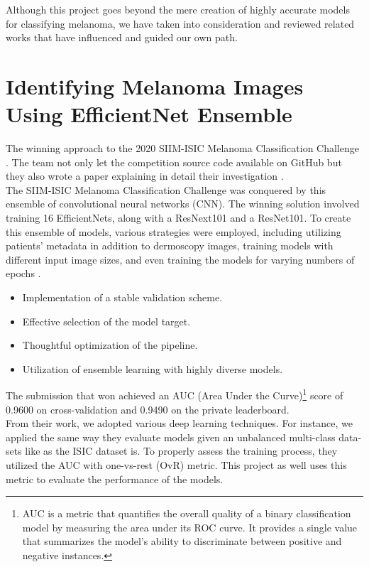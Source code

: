 Although this project goes beyond the mere creation of highly accurate models
for classifying melanoma, we have taken into consideration and reviewed related
works that have influenced and guided our own path.

\section{Identifying Melanoma Images Using EfficientNet Ensemble}

The winning approach to the 2020 SIIM-ISIC Melanoma Classification Challenge
\cite{ISICKaggle}. The team not only let the competition source code available
on GitHub \cite{WinningISICGithub} but they also wrote a paper explaining in
detail their investigation \cite{WinningISIC}. \\

The SIIM-ISIC Melanoma Classification Challenge was conquered by this ensemble of
convolutional neural networks (CNN). The winning solution involved training 16
EfficientNets, along with a ResNext101 and a ResNet101. To create this ensemble
of models, various strategies were employed, including utilizing patients'
metadata in addition to dermoscopy images, training models with different input
image sizes, and even training the models for varying numbers of epochs
\cite{WinningISIC}.

\begin{itemize}
  \item Implementation of a stable validation scheme.
  \item Effective selection of the model target.
  \item Thoughtful optimization of the pipeline.
  \item Utilization of ensemble learning with highly diverse models.
\end{itemize}

The submission that won achieved an AUC (Area Under the Curve)\footnote{AUC is
a metric that quantifies the overall quality of a binary classification model
by measuring the area under its ROC curve. It provides a single value that
summarizes the model's ability to discriminate between positive and negative
instances.} score of 0.9600 on cross-validation and 0.9490 on the private
leaderboard. \\

From their work, we adopted various deep learning techniques. For instance, we
applied the same way they evaluate models given an unbalanced multi-class
data-sets like as the ISIC dataset is. To properly assess the training process,
they utilized the AUC with one-vs-rest (OvR) metric. This project as well uses
this metric to evaluate the performance of the models. \\

